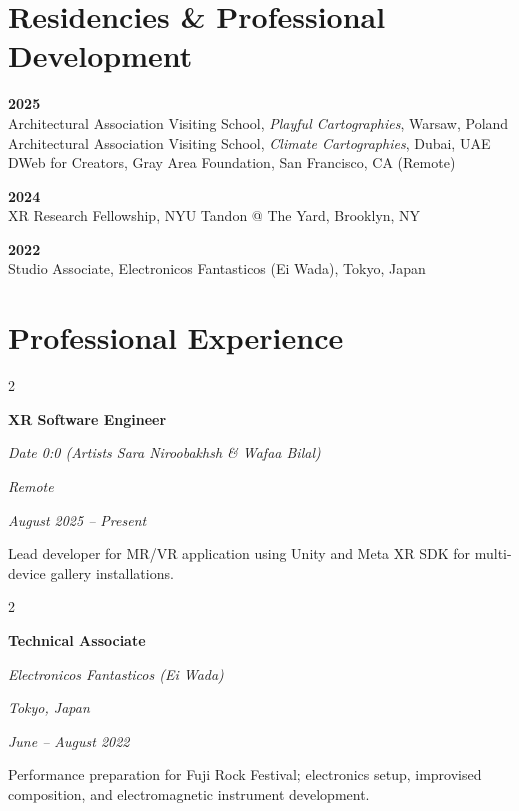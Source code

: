 \documentclass[11pt,a4paper]{article}
\newenvironment{onecolentry}{
    \vspace{0.1em}
}{
    \vspace{0.1em}
}
\newenvironment{twocolentry}[2][]{
    \onecolentry
    \def\secondColumn{#2}
    \setcolumnwidth{\fill, 5.0 cm}
    \begin{paracol}{2}
}{
    \switchcolumn \raggedleft \secondColumn
    \end{paracol}
    \endonecolentry
}
\begin{document}
\section*{Residencies \& Professional Development}

\textbf{2025}\\
Architectural Association Visiting School, \textit{Playful Cartographies}, Warsaw, Poland\\
Architectural Association Visiting School, \textit{Climate Cartographies}, Dubai, UAE\\
DWeb for Creators, Gray Area Foundation, San Francisco, CA (Remote)

\textbf{2024}\\
XR Research Fellowship, NYU Tandon @ The Yard, Brooklyn, NY

\textbf{2022}\\
Studio Associate, Electronicos Fantasticos (Ei Wada), Tokyo, Japan

\section*{Professional Experience}

\begin{twocolentry}{
    \textit{Remote}

    \textit{August 2025 -- Present}
}
    \textbf{XR Software Engineer}

    \textit{Date 0:0 (Artists Sara Niroobakhsh \& Wafaa Bilal)}
\end{twocolentry}
\vspace{0.10 cm}
\begin{onecolentry}
    Lead developer for MR/VR application using Unity and Meta XR SDK for multi-device gallery installations.
\end{onecolentry}

\begin{twocolentry}{
    \textit{Tokyo, Japan}

    \textit{June -- August 2022}
}
    \textbf{Technical Associate}

    \textit{Electronicos Fantasticos (Ei Wada)}
\end{twocolentry}
\vspace{0.10 cm}
\begin{onecolentry}
    Performance preparation for Fuji Rock Festival; electronics setup, improvised composition, and electromagnetic instrument development.
\end{onecolentry}
\vspace{1 cm}
\end{document}
